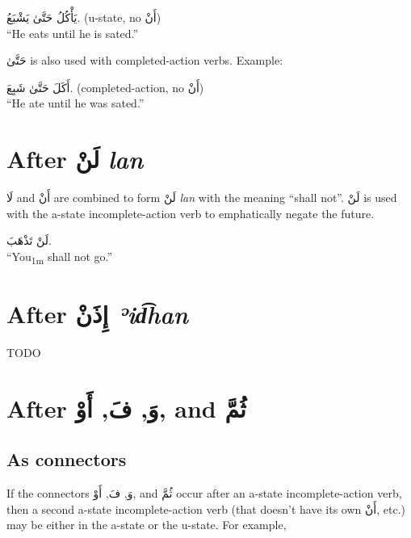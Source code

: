 \documentclass[
  10pt,
]{book}
\begin{document}
\foreignlanguage{arabic}{يَأْکُلُ حَتَّىٰ يَشْبَعُ.} (u-state, no \foreignlanguage{arabic}{أَنْ})\\
\enquote{He eats until he is sated.}

\foreignlanguage{arabic}{حَتَّىٰ}
is also used with completed-action verbs. Example:

\foreignlanguage{arabic}{أَکَلَ حَتَّىٰ شَبِعَ.} (completed-action, no \foreignlanguage{arabic}{أَنْ})\\
\enquote{He ate until he was sated.}

\section{\texorpdfstring{After \foreignlanguage{arabic}{لَنْ} \emph{lan}}{After لَنْ lan}}\label{after-ux644ux646-lan}

\foreignlanguage{arabic}{لَا} and \foreignlanguage{arabic}{أَنْ} are combined to form \foreignlanguage{arabic}{لَنْ} \emph{lan} with the meaning \enquote{shall not}. \foreignlanguage{arabic}{لَنْ} is used with the a-state incomplete-action verb to emphatically negate the future.

\foreignlanguage{arabic}{لَنْ تَذْهَبَ.}\\
\enquote{You\textsubscript{1m} shall not go.}

\section{\texorpdfstring{After \foreignlanguage{arabic}{إِذَنْ} \emph{ʾid͡han}}{After إِذَنْ ʾid͡han}}\label{after-ux625ux630ux646-eipan}

TODO

\section{\texorpdfstring{After \foreignlanguage{arabic}{وَ}, \foreignlanguage{arabic}{فَ}, \foreignlanguage{arabic}{أَوْ}, and \foreignlanguage{arabic}{ثُمَّ}}{After وَ, فَ, أَوْ, and ثُمَّ}}\label{after-ux648-ux641-ux623ux648-and-ux62bux645}

\subsection{As connectors}\label{as-connectors}

If the connectors
\foreignlanguage{arabic}{وَ}, \foreignlanguage{arabic}{فَ}, \foreignlanguage{arabic}{أَوْ}, and \foreignlanguage{arabic}{ثُمَّ}
occur after an a-state incomplete-action verb, then
a second a-state incomplete-action verb
(that doesn't have its own \foreignlanguage{arabic}{أَنْ}, etc.)
may be either in the a-state or the u-state.
For example,
\end{document}
